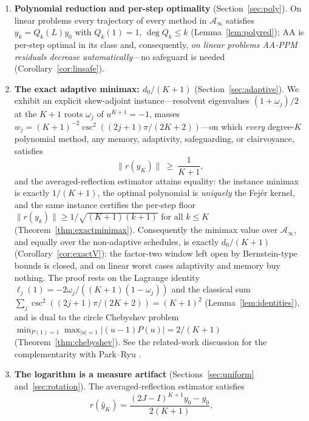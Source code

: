 \documentclass[11pt]{article}
\theoremstyle{definition}
\theoremstyle{remark}
\newcommand{\Aa}{\mathcal{A}}
\newcommand{\norm}[1]{\| #1 \|}
\newcommand{\abs}[1]{| #1 |}
\begin{document}
\begin{enumerate}[label=\textbf{C\arabic*.},leftmargin=3.2em]
\item \textbf{Polynomial reduction and per-step optimality}
      (Section~\ref{sec:poly}). On linear problems every trajectory of every
      method in $\Aa_\infty$ satisfies $y_k=Q_k(L)y_0$ with $Q_k(1)=1$,
      $\deg Q_k\le k$ (Lemma~\ref{lem:polyred}); AA is per-step optimal in
      its class and, consequently, \emph{on linear problems AA-PPM residuals
      decrease automatically}---no safeguard is needed
      (Corollary~\ref{cor:linsafe}).
\item \textbf{The exact adaptive minimax: $d_0/(K+1)$}
      (Section~\ref{sec:adaptive}). We exhibit an explicit skew-adjoint
      instance---resolvent eigenvalues $(1+\omega_j)/2$ at the $K+1$ roots
      $\omega_j$ of $u^{K+1}=-1$, masses
      $w_j=(K+1)^{-2}\csc^2((2j+1)\pi/(2K+2))$---on which \emph{every}
      degree-$K$ polynomial method, any memory, adaptivity, safeguarding,
      or clairvoyance, satisfies
      \begin{equation}\label{eq:adaptive}
      \norm{r(y_K)}\ \ge\ \frac1{K+1},
      \end{equation}
      and the averaged-reflection estimator attains equality: the instance
      minimax is exactly $1/(K+1)$, the optimal polynomial is
      \emph{uniquely} the Fej\'er kernel, and the same instance certifies
      the per-step floor $\norm{r(y_k)}\ge1/\sqrt{(K+1)(k+1)}$ for all
      $k\le K$ (Theorem~\ref{thm:exactminimax}). Consequently the minimax
      value over $\Aa_\infty$, and equally over the non-adaptive
      schedules, is exactly $d_0/(K+1)$ (Corollary~\ref{cor:exactV}): the
      factor-two window left open by Bernstein-type bounds is closed, and
      on linear worst cases adaptivity and memory buy nothing. The proof
      rests on the Lagrange identity
      $\ell_j(1)=-2\omega_j/((K+1)(1-\omega_j))$ and the classical sum
      $\sum_j\csc^2((2j+1)\pi/(2K+2))=(K+1)^2$
      (Lemma~\ref{lem:identities}), and is dual to the circle Chebyshev
      problem $\min_{P(1)=1}\max_{\abs u=1}\abs{(u-1)P(u)}=2/(K+1)$
      (Theorem~\ref{thm:chebyshev}). See the related-work discussion for
      the complementarity with Park--Ryu \cite{park2022exact}.
\item \textbf{The logarithm is a measure artifact}
      (Sections~\ref{sec:uniform} and~\ref{sec:rotation}). The
      averaged-reflection estimator satisfies
      \begin{equation}\label{eq:avref}
      r(\hat y_K)=\frac{(2J-I)^{K+1}y_0-y_0}{2(K+1)},\qquad

\end{equation}
\end{enumerate}
\end{document}

